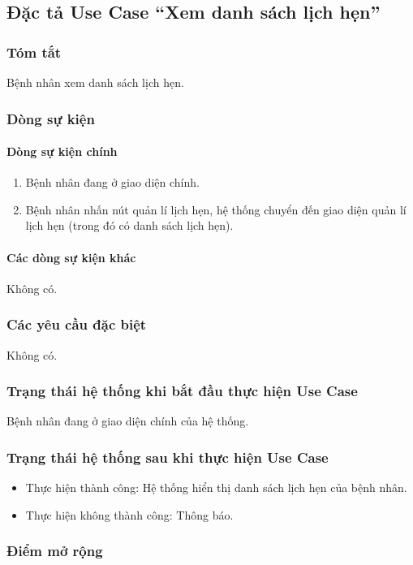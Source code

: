 \subsection{Đặc tả Use Case ``Xem danh sách lịch hẹn''}

\subsubsection{Tóm tắt}
Bệnh nhân xem danh sách lịch hẹn.

\subsubsection{Dòng sự kiện}
\paragraph{\textbf{Dòng sự kiện chính}}
\begin{enumerate}
  \item Bệnh nhân đang ở giao diện chính.
  \item Bệnh nhân nhấn nút quản lí lịch hẹn, hệ thống chuyển đến giao diện quản lí lịch hẹn (trong đó có danh sách lịch hẹn).
\end{enumerate}

\paragraph{\textbf{Các dòng sự kiện khác}}
Không có.

\subsubsection{Các yêu cầu đặc biệt}
Không có.

\subsubsection{Trạng thái hệ thống khi bắt đầu thực hiện Use Case}
Bệnh nhân đang ở giao diện chính của hệ thống.

\subsubsection{Trạng thái hệ thống sau khi thực hiện Use Case}
\begin{itemize}
  \item Thực hiện thành công: Hệ thống hiển thị danh sách lịch hẹn của bệnh nhân.
  \item Thực hiện không thành công: Thông báo.
\end{itemize}

\subsubsection{Điểm mở rộng}